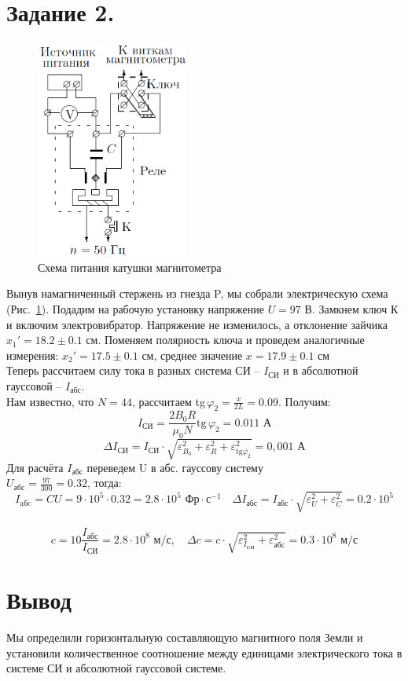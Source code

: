 \documentclass[a4paper, 12pt]{article}
\begin{document}
	\section*{Задание 2.}
	\begin{figure}
		\includegraphics[width=50mm]{station3.png}	
		\caption{Схема питания катушки магнитометра}
		\label{im:station3}
	\end{figure}
	Вынув намагниченный стержень из гнезда P, мы собрали электрическую схема (Рис.~\ref{im:station3}). Подадим на рабочую установку напряжение $U=97\text{ В}$. Замкнем ключ К и включим электровибратор. Напряжение не изменилось, а отклонение зайчика $x_1'=18.2\pm0.1\text{ см}$. Поменяем полярность ключа и проведем аналогичные измерения: $x_2'=17.5\pm0.1\text{ см}$, среднее значение $x=17.9\pm0.1\text{ см}$\\
	Теперь рассчитаем силу тока в разных система СИ -- $I_{\text{СИ}}$ и в абсолютной гауссовой -- $I_\text{абс}$. \\
	Нам известно, что $N=44$, рассчитаем tg$\,\varphi_2=\frac{x}{2L}=0.09$. Получим:
	$$I_{\text{СИ}}=\dfrac{2B_0R}{\mu_0N}\text{tg}\,\varphi_2=0.011\text{ А}$$
	$$\Delta I_\text{СИ}=I_\text{СИ}\cdot\sqrt{\varepsilon_{B_0}^2+\varepsilon_R^2+\varepsilon_{\text{tg}\varphi_2}^2}=0,001\text{ А}$$
	Для расчёта $I_\text{абс}$ переведем U в абс. гауссову систему\\ $U_\text{абс}=\frac{97}{300}=0.32$, тогда:
	$$I_\text{aбc}=CU=9\cdot10^5\cdot0.32=2.8\cdot10^5\text{ Фр}\cdot\text{с}^{-1}\quad \Delta I_\text{абс}=I_\text{абс}\cdot\sqrt{\varepsilon_U^2+\varepsilon_C^2}=0.2\cdot10^{5}$$  \\
	$$c=10\dfrac{I_\text{абс}}{I_\text{СИ}}=2.8\cdot10^8 \text{ м/с},\quad \Delta c=c\cdot \sqrt{\varepsilon_{I_\text{СИ}}^2+\varepsilon_\text{абс}^2}=0.3\cdot10^8\text{ м/с}$$
	\section*{Вывод}
	 Мы определили горизонтальную составляющую магнитного поля Земли и установили количественное соотношение между единицами электрического тока в системе СИ и абсолютной гауссовой системе.
\end{document}
